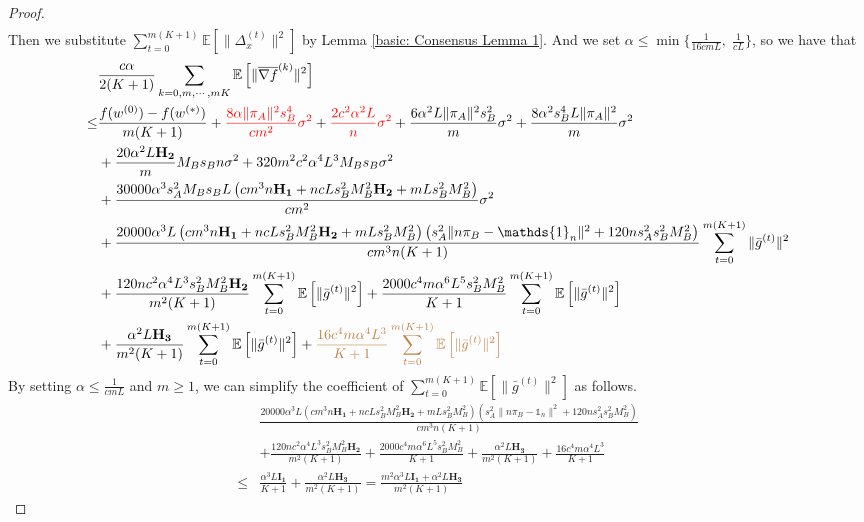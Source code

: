 \documentclass{article}
\newcommand{\EE}[1]{\mathbb{E}\left[#1\right]}
\newcommand{\norm}[1]{\| #1 \|}
\newcommand{\one}{\mathds{1}_n}
\begin{document}
\begin{proof}
\begin{align*}
  \end{align*}
  Then we substitute $\sum_{t=0}^{m(K+1)}\EE{\norm{\Delta_x^{(t)}}^2}$ by Lemma \ref{basic: Consensus Lemma 1}. And we set $\alpha \leq \min\{\frac{1}{16cmL},\; \frac{1}{cL}\}$, so we have that 
  \begin{align*}
    &\frac{c\alpha }{2(K+1)}\sum_{k=0,m,\cdots,mK}\EE{\norm{\overline{\nabla f}^{(k)}}^2}
  \\\leq& \frac{f(w^{(0)})-f(w^{(*)})}{m(K+1)}+\textcolor{red}{\frac{8\alpha \norm{\pi_A}^2s_B^4}{cm^2}\sigma^2}+\textcolor{red}{ \frac{2c^2\alpha^2L}{n}\sigma^2}+\frac{6\alpha^2L\norm{\pi_A}^2s_B^2}{m}\sigma^2+\frac{8\alpha^2s_B^4L\norm{\pi_A}^2}{m}\sigma^2\\&+\frac{20\alpha^2 L \mathbf{H_2}}{m}M_Bs_Bn \sigma^2+320m^2c^2\alpha^4L^3M_Bs_B\sigma^2\\&+\frac{30000\alpha^3 s_A^2M_Bs_BL \left(cm^3n\mathbf{H_1}+nc Ls_B^2M_B^2\mathbf{H_2} +mLs_B^2M_B^2\right)}{cm^2}\sigma^2\\&+\frac{20000\alpha^3 L \left(cm^3n\mathbf{H_1}+nc Ls_B^2M_B^2\mathbf{H_2} +mLs_B^2M_B^2\right)\left(s_A^2\norm{n\pi_B-\one}^2+120ns_A^2s_B^2M_B^2\right)}{cm^3n(K+1)} \sum_{t=0}^{m(K+1)}\norm{\bar{g}^{(t)}}^2\\&+\frac{120nc^2\alpha^4 L^3s_B^2M_B^2 \mathbf{H_2}}{m^2(K+1)} \sum_{t=0}^{m(K+1)} \EE{\norm{\bar{g}^{(t)}}^2}+\frac{2000c^4m\alpha^6L^5s_B^2M_B^2 }{K+1}\sum_{t=0}^{m(K+1)}\EE{\norm{\bar{g}^{(t)}}^2} \\&+\frac{\alpha^2 L \mathbf{H_3}}{m^2(K+1)}\sum_{t=0}^{m(K+1)}\EE{\norm{\bar{g}^{(t)}}^2}+\textcolor{brown}{\frac{16c^4m\alpha^4L^3}{K+1}\sum_{t=0}^{m(K+1)}\EE{\norm{\bar{g}^{(t)}}^2}}
  \end{align*}
  By setting $\alpha \leq \frac{1}{cmL}$ and $m\geq 1$, we can simplify the coefficient of $\sum_{t=0}^{m(K+1)}\EE{\norm{\bar{g}^{(t)}}^2}$ as follows.
  \begin{align*}
    &\frac{20000\alpha^3 L \left(cm^3n\mathbf{H_1}+nc Ls_B^2M_B^2\mathbf{H_2} +mLs_B^2M_B^2\right)\left(s_A^2\norm{n\pi_B-\one}^2+120ns_A^2s_B^2M_B^2\right)}{cm^3n(K+1)}\\&+\frac{120nc^2\alpha^4 L^3s_B^2M_B^2 \mathbf{H_2}}{m^2(K+1)} +\frac{2000c^4m\alpha^6L^5s_B^2M_B^2 }{K+1}+\frac{\alpha^2 L \mathbf{H_3}}{m^2(K+1)}+\frac{16c^4m\alpha^4L^3}{K+1}\\
    \leq & \frac{\alpha^3 L\mathbf{I_1} }{K+1}+\frac{\alpha^2 L \mathbf{H_3}}{m^2(K+1)}=\frac{m^2\alpha^3L\mathbf{I_1}+\alpha^2 L \mathbf{H_3}}{m^2(K+1)}
  \end{align*}

\end{proof}
\end{document}
